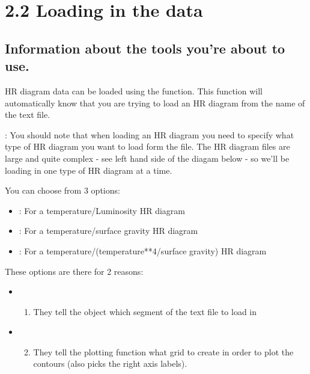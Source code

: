 \documentclass[letterpaper,10pt,english]{sphinxmanual}
\begin{document}
\section{2.2 Loading in the data}
\label{\detokenize{HR_diagrams:2.2-Loading-in-the-data}}

\subsection{Information about the tools you’re about to use.}
\label{\detokenize{HR_diagrams:Information-about-the-tools-you're-about-to-use.}}
HR diagram data can be loaded using the  function. This function will automatically know that you are trying to load an HR diagram from the name of the text file.

: You should note that when loading an HR diagram you need to specify what type of HR diagram you want to load form the file. The HR diagram files are large and quite complex - see left hand side of the diagam below - so we’ll be loading in one type of HR diagram at a time.

You can choose from 3 options:
\begin{itemize}
\item {} 
: For a temperature/Luminosity HR diagram

\item {} 
: For a temperature/surface gravity HR diagram

\item {} 
: For a temperature/(temperature**4/surface gravity) HR diagram

\end{itemize}

These options are there for 2 reasons:
\begin{itemize}
\item {} \begin{enumerate}
\item {} 
They tell the object which segment of the text file to load in

\end{enumerate}

\item {} \begin{enumerate}
\setcounter{enumi}{1}
\item {} 
They tell the plotting function what grid to create in order to plot the contours (also picks the right axis labels).

\end{enumerate}

\end{itemize}
\end{document}
